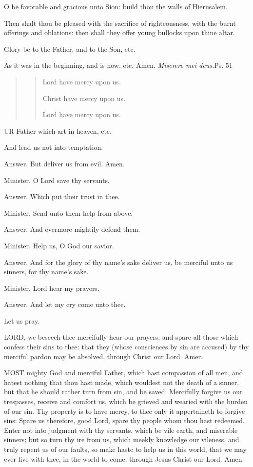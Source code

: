 O be favorable and gracious unto Sion: build thou the walls of
Hierusalem.

Then shalt thou be pleased with the sacrifice of righteousness, with
the burnt offerings and oblations: then shall they offer young bullocks upon thine altar.

Glory be to the Father, and to the Son, etc.

As it was in the beginning, and is now, etc. Amen. \emph{Miserere mei deus.}Ps. 51

\begin{quote}

\begin{quote}

Lord have mercy upon us.

Christ have mercy upon us.

Lord have mercy upon us.

\end{quote}

\end{quote}

UR Father which art in heaven, etc.

And lead us not into temptation.

Answer. But deliver us from evil. Amen.

Minister. O Lord save thy servants.

Answer. Which put their trust in thee.

Minister. Send unto them help from above.

Answer. And evermore mightily defend them.

Minister. Help us, O God our savior.

Answer. And for the glory of thy name's sake
deliver us, be merciful unto us sinners, for thy name's sake.

Minister. Lord hear my prayers.

Answer. And let my cry come unto thee.

Let us pray.

LORD, we beseech thee mercifully hear our prayers, and spare all those which
confess their sins to thee: that they (whose consciences by sin are accused) by thy
merciful pardon may be absolved, through Christ our Lord. Amen.

MOST mighty God and merciful Father, which hast compassion of all men, and
hatest nothing that thou hast made, which wouldest not the death of a sinner, but that he
should rather turn from sin, and be saved: Mercifully forgive us our trespasses, receive
and comfort us, which be grieved and wearied with the burden of our sin. Thy property is
to have mercy, to thee only it appertaineth to forgive sins: Spare us therefore, good
Lord, spare thy people whom thou hast redeemed. Enter not into judgment with thy servants,
which be vile earth, and miserable sinners; but so turn thy ire from us, which meekly
knowledge our vileness, and truly repent us of our faults, so make haste to help us in
this world, that we may ever live with thee, in the world to come; through Jesus Christ
our Lord. Amen.

